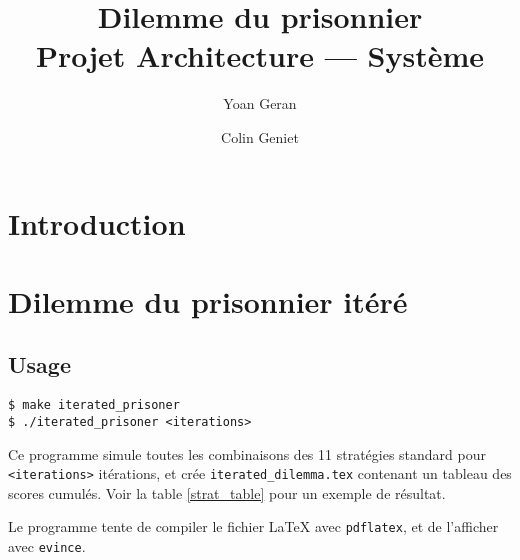 \documentclass[draft,10pt]{article}
\title{Dilemme du prisonnier \\ Projet Architecture --- Système}
\author{Yoan Geran \and Colin Geniet}
\begin{document}
\maketitle
\tableofcontents

\section*{Introduction}

\section{Dilemme du prisonnier itéré}
\subsection{Usage}
\begin{verbatim}
$ make iterated_prisoner
$ ./iterated_prisoner <iterations>
\end{verbatim}

Ce programme simule toutes les combinaisons des 11 stratégies standard pour \verb|<iterations>| itérations,
et crée \verb|iterated_dilemma.tex| contenant un tableau des scores cumulés.
Voir la table \ref{strat_table} pour un exemple de résultat.

Le programme tente de compiler le fichier \LaTeX{} avec \verb|pdflatex|, et de l'afficher avec \verb|evince|.
\end{document}

